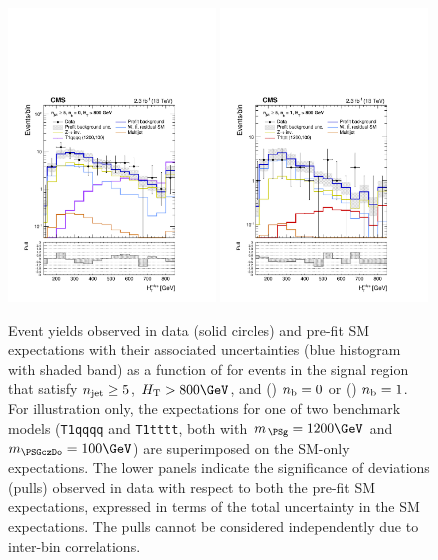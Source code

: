 \begin{figure}[!tbh]
  \centering
    \includegraphics[width=0.49\textwidth]{Figure_006-a.pdf}
    \includegraphics[width=0.49\textwidth]{Figure_006-b.pdf} \\
    \caption{Event yields observed in data (solid circles) and pre-fit
      SM expectations with their associated uncertainties (blue
      histogram with shaded band) as a function of \HTmiss for events
      in the signal region that satisfy $n_{\text{jet}} \geq 5$, $\scalht >
      800\GeV$, and (\cmsLeft) $n_{\text{b}} = 0$ or (\cmsRight) $n_{\text{b}} = 1$. For
      illustration only, the expectations for one of two benchmark
      models (\texttt{T1qqqq} and \texttt{T1tttt}, both with
      $m_{\,\PSg} = 1200\GeV$ and $m_{\PSGczDo} = 100\GeV$) are
      superimposed on the SM-only expectations. The lower panels
      indicate the significance of deviations (pulls) observed in data
      with respect to both the pre-fit SM expectations, expressed in
      terms of the total uncertainty in the SM expectations. The pulls
      cannot be considered independently due to inter-bin
      correlations. }
    \label{fig:mht-templates}
\end{figure}

